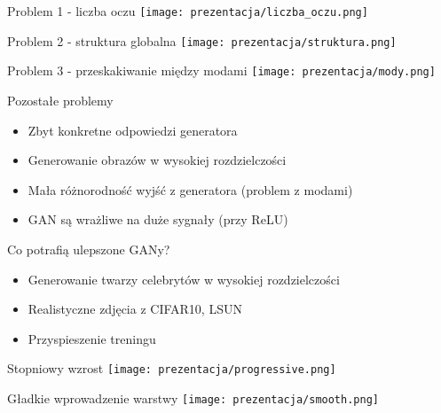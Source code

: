 \documentclass[11pt]{beamer}
\begin{document}
\begin{frame}{Problem 1 - liczba oczu}
\minipage{\textwidth}
\texttt{[image: prezentacja/liczba\_oczu.png]}
\endminipage
\end{frame}

\begin{frame}{Problem 2 - struktura globalna}
\minipage{\textwidth}
\texttt{[image: prezentacja/struktura.png]}
\endminipage
\end{frame}


\begin{frame}{Problem 3 - przeskakiwanie między modami}
\minipage{\textwidth}
\texttt{[image: prezentacja/mody.png]}
\endminipage
\end{frame}
    

\begin{frame}{Pozostałe problemy}
\begin{itemize}
    \item Zbyt konkretne odpowiedzi generatora
    \item Generowanie obrazów w wysokiej rozdzielczości
    \item Mała różnorodność wyjść z generatora (problem z modami)
    \item GAN są wrażliwe na duże sygnały (przy ReLU)
\end{itemize}
\end{frame}

\begin{frame}{Co potrafią ulepszone GANy?}
\begin{itemize}
    \item Generowanie twarzy celebrytów w wysokiej rozdzielczości
    \item Realistyczne zdjęcia z CIFAR10, LSUN
    \item Przyspieszenie treningu
\end{itemize}
\end{frame}

\begin{frame}{Stopniowy wzrost}
\minipage{\textwidth}
\texttt{[image: prezentacja/progressive.png]}
\endminipage
\end{frame}

\begin{frame}{Gładkie wprowadzenie warstwy}
\minipage{\textwidth}
\texttt{[image: prezentacja/smooth.png]}
\endminipage
\end{frame}
\end{document}
